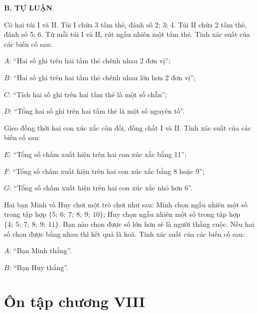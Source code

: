 \begin{exercises}
    \textbf{B. TỰ LUẬN}

    \begin{questions}[resume=SGK]
        \item Có hai túi I và II. Túi I chứa 3 tấm thẻ, đánh số 2; 3; 4. Túi II chứa 2 tấm thẻ, đánh số 5; 6. Từ mỗi túi I và II, rút ngẫu nhiên một tấm thẻ. Tính xác suất của các biến cố sau:

        $A$: “Hai số ghi trên hai tấm thẻ chênh nhau 2 đơn vị”;\par
        $B$: “Hai số ghi trên hai tấm thẻ chênh nhau lớn hơn 2 đơn vị”;\par
        $C$: “Tích hai số ghi trên hai tấm thẻ là một số chẵn”;\par
        $D$: “Tổng hai số ghi trên hai tấm thẻ là một số nguyên tố”.
        \answerline
        \answerline
        \answerline

        \item Gieo đồng thời hai con xúc xắc cân đối, đồng chất I và II. Tính xác suất của các biến cố sau:

        $E$: “Tổng số chấm xuất hiện trên hai con xúc xắc bằng 11”;\par
        $F$: “Tổng số chấm xuất hiện trên hai con xúc xắc bằng 8 hoặc 9”;\par
        $G$: “Tổng số chấm xuất hiện trên hai con xúc xắc nhỏ hơn 6”.
        \answerline
        \answerline
        \answerline

        \item Hai bạn Minh và Huy chơi một trò chơi như sau: Minh chọn ngẫu nhiên một số trong tập hợp $\{5;\ 6;\ 7;\ 8;\ 9;\ 10\}$; Huy chọn ngẫu nhiên một số trong tập hợp $\{4;\ 5;\ 7;\ 8;\ 9;\ 11\}$. Bạn nào chọn được số lớn hơn sẽ là người thắng cuộc. Nếu hai số chọn được bằng nhau thì kết quả là hoà. Tính xác suất của các biến cố sau:
        \begin{questions}
            \item $A$: “Bạn Minh thắng”.
            \item $B$: “Bạn Huy thắng”.
        \end{questions}
        \answerline
        \answerline
        \answerline
    \end{questions}
\end{exercises}

\section*{Ôn tập chương VIII}

